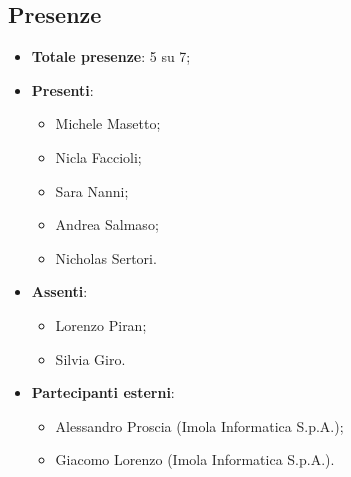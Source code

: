 \documentclass[11pt]{article}
\begin{document}
	\subsection{Presenze}
	\begin{itemize}
		\item \textbf{Totale presenze}: 5 su 7;
		\item \textbf{Presenti}:
		\begin{itemize}  
			\item Michele Masetto;
			\item Nicla Faccioli;
			\item Sara Nanni;
			\item Andrea Salmaso;
			\item Nicholas Sertori.
		\end{itemize}
		\item \textbf{Assenti}:
			\begin{itemize}
				\item Lorenzo Piran;
				\item Silvia Giro.
			\end{itemize}
		\item \textbf{Partecipanti esterni}:
			\begin{itemize}
				\item Alessandro Proscia (Imola Informatica S.p.A.);
				\item Giacomo Lorenzo (Imola Informatica S.p.A.).
			\end{itemize}
	\end{itemize}

	\newpage
\end{document}
